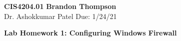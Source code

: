 \noindent
\textbf{CIS4204.01} \hfill \textbf{Brandon Thompson} \\
\normalsize Dr. Ashokkumar Patel \hfill Due: 1/24/21\\

\begin{center}
\textbf{Lab Homework 1: Configuring Windows Firewall}
\end{center}